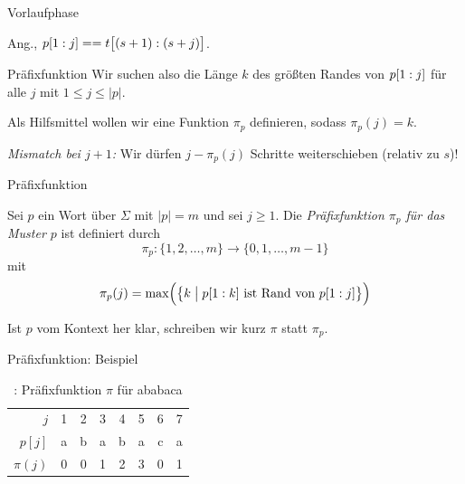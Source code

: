 \documentclass[xcolor=dvipsnames, aspectratio=169]{beamer}
\begin{document}
\begin{frame}{Vorlaufphase}
\begin{center}
{}
\end{center}\medskip

Ang., $p[1: j] == t\big[(s+1):(s+j)\big]$. 
\end{frame}

\begin{frame}{Präfixfunktion}
Wir suchen also die Länge $k$ des größten Randes von $p[1: j]$ für alle $j$ mit $1\leq j\leq\vert p\vert$.\bigskip\pause

Als Hilfsmittel wollen wir eine Funktion $\pi_p$ definieren, sodass $\pi_p(j)=k$.\bigskip\pause

\textit{Mismatch bei $j+1$:} Wir dürfen $j-\pi_p(j)$ Schritte weiterschieben (relativ zu $s$)!
\end{frame}

\begin{frame}{Präfixfunktion}
\begin{defi}
Sei $p$ ein Wort über $\Sigma$ mit $\vert p\vert=m$ und sei $j\geq 1$. Die \emph{Präfixfunktion $\pi_p$ für das Muster $p$} ist definiert durch \[\pi_p\colon\{1,2,\dots,m\}\to\{0,1,\dots,m-1\}\] mit
\[\pi_p(j)=\mathrm{max}\Big(\big\{k\;\big\vert\;p[1: k]\text{ ist Rand von }p[1: j]\big\}\Big)\]
\end{defi}\medskip

Ist $p$ vom Kontext her klar, schreiben wir kurz $\pi$ statt $\pi_p$.
\end{frame}

\begin{frame}[label=prefix]{Präfixfunktion: Beispiel}
\begin{table}\setlength\extrarowheight{.3em}
\begin{tabular}{r@{\hskip 2em}ccccccc}
\toprule
$j$ & 1 & 2 & 3 & 4 & 5 & 6 & 7 \\ 
$p[j]$ & a & b & a & b & a & c & a \\ 
$\pi(j)$ & 0 & 0 & 1 & 2 & 3 & 0 & 1 \\ 
\bottomrule
\end{tabular}
\caption{\cite{cormenalgorithms2009}: Präfixfunktion $\pi$ für ababaca}
\end{table}
\end{frame}
\end{document}
